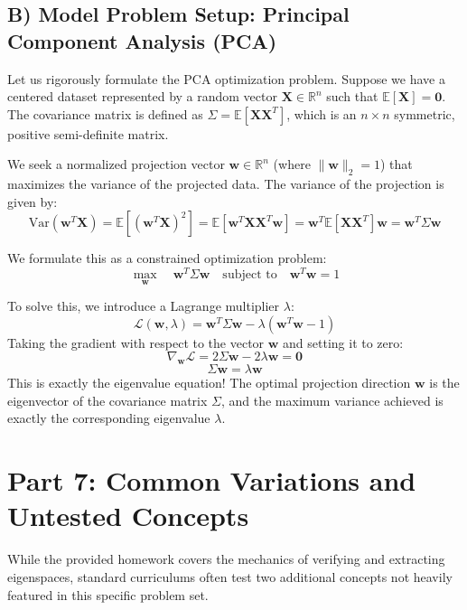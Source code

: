 \documentclass[11pt, a4paper]{article}
\theoremstyle{definition}
\theoremstyle{remark}
\newcommand{\R}{\mathbb{R}}
\newcommand{\E}{\mathbb{E}}
\begin{document}
\subsection{B) Model Problem Setup: Principal Component Analysis (PCA)}
Let us rigorously formulate the PCA optimization problem. Suppose we have a centered dataset represented by a random vector $\mathbf{X} \in \R^n$ such that $\E[\mathbf{X}] = \mathbf{0}$. The covariance matrix is defined as $\Sigma = \E[\mathbf{X}\mathbf{X}^T]$, which is an $n \times n$ symmetric, positive semi-definite matrix.

We seek a normalized projection vector $\mathbf{w} \in \R^n$ (where $\|\mathbf{w}\|_2 = 1$) that maximizes the variance of the projected data. The variance of the projection is given by:
\[ \text{Var}(\mathbf{w}^T \mathbf{X}) = \E[(\mathbf{w}^T \mathbf{X})^2] = \E[\mathbf{w}^T \mathbf{X} \mathbf{X}^T \mathbf{w}] = \mathbf{w}^T \E[\mathbf{X}\mathbf{X}^T] \mathbf{w} = \mathbf{w}^T \Sigma \mathbf{w} \]

We formulate this as a constrained optimization problem:
\[ \max_{\mathbf{w}} \quad \mathbf{w}^T \Sigma \mathbf{w} \quad \text{subject to} \quad \mathbf{w}^T \mathbf{w} = 1 \]

To solve this, we introduce a Lagrange multiplier $\lambda$:
\[ \mathcal{L}(\mathbf{w}, \lambda) = \mathbf{w}^T \Sigma \mathbf{w} - \lambda(\mathbf{w}^T \mathbf{w} - 1) \]
Taking the gradient with respect to the vector $\mathbf{w}$ and setting it to zero:
\[ \nabla_{\mathbf{w}} \mathcal{L} = 2\Sigma \mathbf{w} - 2\lambda \mathbf{w} = \mathbf{0} \]
\[ \Sigma \mathbf{w} = \lambda \mathbf{w} \]
This is exactly the eigenvalue equation! The optimal projection direction $\mathbf{w}$ is the eigenvector of the covariance matrix $\Sigma$, and the maximum variance achieved is exactly the corresponding eigenvalue $\lambda$.

\newpage
\section{Part 7: Common Variations and Untested Concepts}

While the provided homework covers the mechanics of verifying and extracting eigenspaces, standard curriculums often test two additional concepts not heavily featured in this specific problem set.
\end{document}
